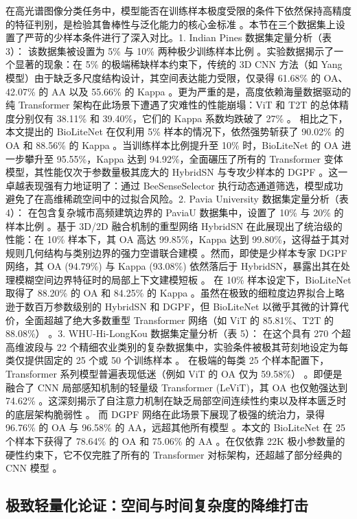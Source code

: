 在高光谱图像分类任务中，模型能否在训练样本极度受限的条件下依然保持高精度的特征判别，是检验其鲁棒性与泛化能力的核心金标准 。本节在三个数据集上设置了严苛的少样本条件进行了深入对比。1. Indian Pines 数据集定量分析（表 3）：
该数据集被设置为 5\% 与 10\% 两种极少训练样本比例 。实验数据揭示了一个显著的现象：在 5\% 的极端稀缺样本约束下，传统的 3D CNN 方法（如 Yang 模型）由于缺乏多尺度结构设计，其空间表达能力受限，仅录得 61.68\% 的 OA、42.07\% 的 AA 以及 55.66\% 的 Kappa 。更为严重的是，高度依赖海量数据驱动的纯 Transformer 架构在此场景下遭遇了灾难性的性能崩塌：ViT 和 T2T 的总体精度分别仅有 38.11\% 和 39.40\%，它们的 Kappa 系数均跌破了 27\% 。
相比之下，本文提出的 BioLiteNet 在仅利用 5\% 样本的情况下，依然强势斩获了 90.02\% 的 OA 和 88.56\% 的 Kappa 。当训练样本比例提升至 10\% 时，BioLiteNet 的 OA 进一步攀升至 95.55\%，Kappa 达到 94.92\%，全面碾压了所有的 Transformer 变体模型，其性能仅次于参数量极其庞大的 HybridSN 与专攻少样本的 DGPF 。这一卓越表现强有力地证明了：通过 BeeSenseSelector 执行动态通道筛选，模型成功避免了在高维稀疏空间中的过拟合风险。2. Pavia University 数据集定量分析（表 4）：
在包含复杂城市高频建筑边界的 PaviaU 数据集中，设置了 10\% 与 20\% 的样本比例 。基于 3D/2D 融合机制的重型网络 HybridSN 在此展现出了统治级的性能：在 10\% 样本下，其 OA 高达 99.85\%，Kappa 达到 99.80\%，这得益于其对规则几何结构与类别边界的强力空谱联合建模 。然而，即使是少样本专家 DGPF 网络，其 OA (94.79\%) 与 Kappa (93.08\%) 依然落后于 HybridSN，暴露出其在处理模糊空间边界特征时的局部上下文建模短板 。
在 10\% 样本设定下，BioLiteNet 取得了 88.20\% 的 OA 和 84.25\% 的 Kappa 。虽然在极致的细粒度边界拟合上略逊于数百万参数级别的 HybridSN 和 DGPF，但 BioLiteNet 以微乎其微的计算代价，全面超越了绝大多数重型 Transformer 网络（如 ViT 的 85.81\%、T2T 的 88.08\%） 。3. WHU-Hi-LongKou 数据集定量分析（表 5）：
在这个具有 270 个超高维波段与 22 个精细农业类别的复杂数据集中，实验条件被极其苛刻地设定为每类仅提供固定的 25 个或 50 个训练样本 。
在极端的每类 25 个样本配置下，Transformer 系列模型普遍表现低迷（例如 ViT 的 OA 仅为 59.58\%） 。即便是融合了 CNN 局部感知机制的轻量级 Transformer (LeViT)，其 OA 也仅勉强达到 74.62\% 。这深刻揭示了自注意力机制在缺乏局部空间连续性约束以及样本匮乏时的底层架构脆弱性 。
而 DGPF 网络在此场景下展现了极强的统治力，录得 96.76\% 的 OA 与 96.58\% 的 AA，远超其他所有模型 。本文的 BioLiteNet 在 25 个样本下获得了 78.64\% 的 OA 和 75.06\% 的 AA 。在仅依靠 22K 极小参数量的硬性约束下，它不仅完胜了所有的 Transformer 对标架构，还超越了部分经典的 CNN 模型 。

\subsection{极致轻量化论证：空间与时间复杂度的降维打击}

